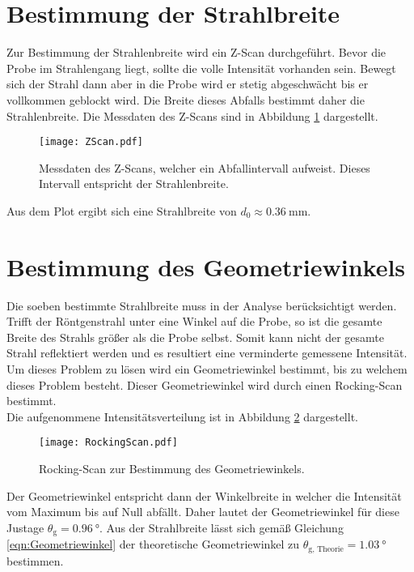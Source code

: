 \section{Bestimmung der Strahlbreite}
\label{sec:ZScan}
Zur Bestimmung der Strahlenbreite wird ein Z-Scan durchgeführt. Bevor die Probe im Strahlengang liegt, sollte die volle Intensität vorhanden sein. Bewegt sich der Strahl dann aber in 
die Probe wird er stetig abgeschwächt bis er vollkommen geblockt wird. Die Breite dieses Abfalls bestimmt daher die Strahlenbreite. Die Messdaten des Z-Scans sind in Abbildung 
\ref{fig:ZScan} dargestellt.

\begin{figure}
    \centering
    \texttt{[image: ZScan.pdf]}
    \caption{Messdaten des Z-Scans, welcher ein Abfallintervall aufweist. Dieses Intervall entspricht der Strahlenbreite.}
    \label{fig:ZScan}
\end{figure}

Aus dem Plot ergibt sich eine Strahlbreite von $d_0 \approx \qty{0.36}{\milli\metre}$. 

\section{Bestimmung des Geometriewinkels}
\label{sec:Rocking}

Die soeben bestimmte Strahlbreite muss in der Analyse berücksichtigt werden. Trifft der Röntgenstrahl unter eine Winkel auf die Probe, so ist die gesamte Breite des Strahls größer als 
die Probe selbst. Somit kann nicht der gesamte Strahl reflektiert werden und es resultiert eine verminderte gemessene Intensität. Um dieses Problem zu lösen wird ein Geometriewinkel 
bestimmt, bis zu welchem dieses Problem besteht. Dieser Geometriewinkel wird durch einen Rocking-Scan bestimmt. \\
Die aufgenommene Intensitätsverteilung ist in Abbildung 
\ref{fig:RockingScan} dargestellt. 
\begin{figure}
    \centering
    \texttt{[image: RockingScan.pdf]}
    \caption{Rocking-Scan zur Bestimmung des Geometriewinkels.}
    \label{fig:RockingScan}
\end{figure}
Der Geometriewinkel entspricht dann der Winkelbreite in welcher die Intensität vom Maximum bis auf Null abfällt. Daher lautet der Geometriewinkel für diese Justage
$\theta_\text{g} = \qty{0.96}{\degree}$. Aus der Strahlbreite lässt sich gemäß Gleichung \ref{eqn:Geometriewinkel} der theoretische Geometriewinkel zu 
$\theta_\text{g, Theorie} = \qty{1.03}{\degree}$ bestimmen.

